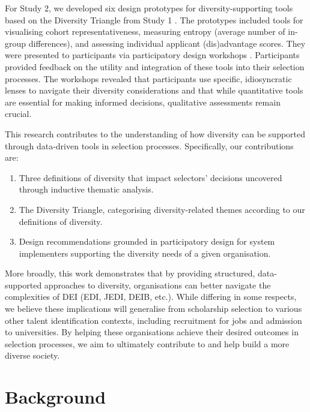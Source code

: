 For Study 2, we developed six design prototypes for diversity-supporting tools based on the Diversity Triangle from Study 1 \cite{Buchenau_Suri_2000}. The prototypes included tools for visualising cohort representativeness, measuring entropy (average number of in-group differences), and assessing individual applicant (dis)advantage scores. They were presented to participants via participatory design workshops \cite{Zimmerman_Forlizzi_2017}. Participants provided feedback on the utility and integration of these tools into their selection processes. The workshops revealed that participants use specific, idiosyncratic lenses to navigate their diversity considerations and that while quantitative tools are essential for making informed decisions, qualitative assessments remain crucial.

This research contributes to the understanding of how diversity can be supported through data-driven tools in selection processes. Specifically, our contributions are:

\begin{enumerate}
    \item Three definitions of diversity that impact selectors' decisions uncovered through inductive thematic analysis.
    \item The Diversity Triangle, categorising diversity-related themes according to our definitions of diversity.
    \item Design recommendations grounded in participatory design for system implementers supporting the diversity needs of a given organisation.
\end{enumerate}

\noindent More broadly, this work demonstrates that by providing structured, data-supported approaches to diversity, organisations can better navigate the complexities of DEI (EDI, JEDI, DEIB, etc.). While differing in some respects, we believe these implications will generalise from scholarship selection to various other talent identification contexts, including recruitment for jobs and admission to universities. By helping these organisations achieve their desired outcomes in selection processes, we aim to ultimately contribute to and help build a more diverse society.

\section{Background}\label{sec:back}
